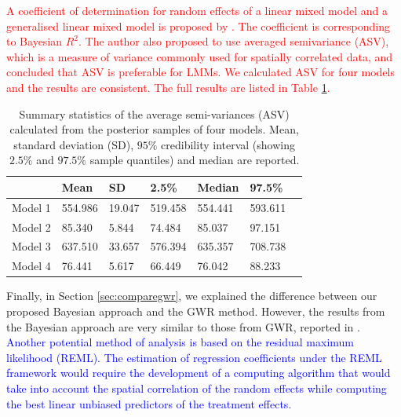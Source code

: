 \documentclass[a4paper]{article}   	%
\newcommand{\rstan}{\texttt{rstan}}
\begin{document}
	
    \textcolor{red}{A coefficient of determination for random effects of a linear mixed model and a generalised linear mixed model is proposed by \textcite{Piepho2019Coefficient}. The coefficient is corresponding to Bayesian $R^2$. The author also proposed to use averaged semivariance (ASV), which is a measure of variance commonly used for spatially correlated data, and concluded that ASV is preferable for LMMs. We calculated ASV for four models and the results are consistent. The full results are listed in Table \ref{tb:asv}. }
    
    \begin{table}[!htp]
    \centering
    \begin{tabular}{lllllll}
    \toprule
            & Mean     & SD     & 2.5\%   & Median    & 97.5\% \\ \midrule
    Model 1 & 554.986  & 19.047 &519.458  & 554.441 & 593.611   \\
    Model 2 & 85.340   & 5.844  & 74.484  & 85.037  & 97.151     \\
    Model 3 & 637.510  & 33.657 & 576.394 & 635.357 & 708.738  \\
    Model 4 & 76.441   & 5.617  & 66.449  & 76.042  & 88.233\\
    \bottomrule
    \end{tabular}\caption{Summary statistics of the average semi-variances (ASV) calculated from the posterior samples of four models. Mean, standard deviation (SD), $95\%$ credibility interval (showing $2.5\%$ and $97.5\%$ sample quantiles) and median are reported.}\label{tb:asv}
    \end{table}
    
    
    
	Finally, in Section \ref{sec:comparegwr}, we explained the difference between our proposed Bayesian approach and the GWR method. However, the results from the Bayesian approach are very similar to those from GWR, reported in \textcite{Rakshit2020Novel}. \textcolor{blue}{Another potential method of analysis is based on the residual maximum likelihood (REML). The estimation of regression coefficients under the REML framework would require the development of a computing algorithm that would take into account the spatial correlation of the random effects while computing the best linear unbiased predictors of the treatment effects.}
	
\end{document}
